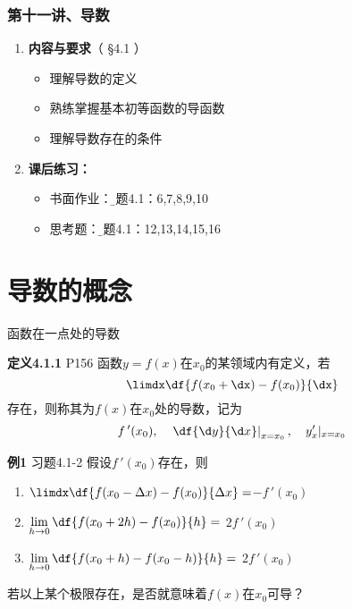 \begin{frame}
	\frametitle{第十一讲、导数}
	\linespread{1.5}
	\begin{enumerate}
	  \item {\bf 内容与要求}{\color{blue}（ \S4.1 ）}
	  \begin{itemize}
	    \item 理解导数的定义
	    \item 熟练掌握基本初等函数的导函数
	    \item 理解导数存在的条件
	  \vspace{1em}
	  \end{itemize}
	  \item {\bf 课后练习：}
	  \begin{itemize}
	    \item 书面作业：{\b 习题4.1：6,7,8,9,10}
	    \item 思考题：{\b 习题4.1：12,13,14,15,16}
	  \end{itemize}
	\end{enumerate}
\end{frame}

\section{导数的概念}

\begin{frame}{函数在一点处的导数}
	\linespread{1.2}\pause 
	\begin{block}{{\bf 定义4.1.1} \hfill P156}
		函数$y=f(x)$在$x_0$的某领域内有定义，\pause 若
		$$\limdx\df{f(x_0+\dx)-f(x_0)}{\dx}$$
		存在，\pause 则称其为{\bb $f(x)$在$x_0$处的导数}，\pause 记为
		$$f\,'(x_0),\quad \left.\df{\d y}{\d x}\right|_{x=x_0},\quad y'_x|_{x=x_0}$$
	\end{block}
\end{frame}

\begin{frame}
	\linespread{2}
	\begin{exampleblock}{{\bf 例1} \hfill 习题4.1-2}
		假设$f\,'(x_0)$存在，则
		\begin{enumerate}\pause 
		  \item $\limdx\df{f(x_0-\Delta x)-f(x_0)}{\Delta
		  x}=$\pause \underline{\quad\alert{$-f\,'(x_0)$}\quad}\pause 
		  \item $\lim\limits_{h\to 0}\df{f(x_0+2h)-f(x_0)}{h}=$
		  \pause \underline{\quad\alert{$2f\,'(x_0)$}\quad}\pause 
		  \item $\lim\limits_{h\to 0}\df{f(x_0+h)-f(x_0-h)}{h}=$\pause 
		  \underline{\quad\alert{$2f\,'(x_0)$}\quad}
		\end{enumerate}
	\end{exampleblock}\pause 
	{}若以上某个极限存在，是否就意味着$f(x)$在$x_0$可导？
\end{frame}

